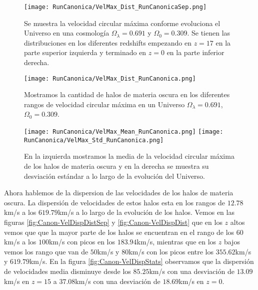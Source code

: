 \begin{figure}[H]
    \centering
    \texttt{[image: RunCanonica/VelMax\_Dist\_RunCanonicaSep.png]}
    \caption[Velocidad circular máxima en la evolución de un Universo $\Omega_\lambda = 0.691 $, $\Omega_0 = 0.309$]{\footnotesize Se muestra la velocidad circular máxima conforme evoluciona el Universo en una cosmología $\Omega_\lambda = 0.691 $ y $\Omega_0 = 0.309$. Se tienen las distribuciones en los diferentes redshifts empezando en $z=17$ en la parte superior izquierda y terminado en $z=0$ en la parte inferior derecha.}
    \label{fig:Canon-VelMaxDistSep}
\end{figure}

\begin{figure}[H]
    \centering
    \texttt{[image: RunCanonica/VelMax\_Dist\_RunCanonica.png]}
    \caption[Distribución de la velocidad circular máxima de un Universo $\Omega_\lambda = 0.691 $, $\Omega_0 = 0.309$]{\footnotesize Mostramos la cantidad de halos de materia oscura en los diferentes rangos de velocidad circular máxima en un Universo $\Omega_\lambda = 0.691 $, $\Omega_0 = 0.309$.}
    \label{fig:Canon-VelMaxDist}
\end{figure}

\begin{figure}[H]
    \centering
    \texttt{[image: RunCanonica/VelMax\_Mean\_RunCanonica.png]}
    \texttt{[image: RunCanonica/VelMax\_Std\_RunCanonica.png]}
    \caption[Media y desviación estándar de la velocidad circular máxima de un Universo $\Omega_\lambda = 0.691 $, $\Omega_0 = 0.309$]{\footnotesize En la izquierda mostramos la media de la velocidad circular máxima de los halos de materia oscura y en la derecha se muestra su desviación estándar a lo largo de la evolución del Universo.}
    \label{fig:Canon-VelMaxStats}
\end{figure}

Ahora hablemos de la dispersion de las velocidades de los halos de materia oscura. La dispersión de velocidades de estos halos esta en los rangos de $12.78$km/s a los $619.79$km/s a lo largo de la evolución de los halos. Vemos en las figuras \ref{fig:Canon-VelDispDistSep} y \ref{fig:Canon-VelDispDist} que en los $z$ altos vemos que que la mayor parte de los halos se encuentran en el rango de los $60$km/s a los $100$km/s con picos en los $183.94$km/s, mientras que en los $z$ bajos vemos los rango que van de $50$km/s y $80$km/s con los picos entre los $355.62$km/s y $619.79$km/s. En la figura \ref{fig:Canon-VelDispStats} observamos que la dispersión de velocidades media disminuye desde los $85.25$km/s con una desviación de $13.09$km/s en $z=15$ a $37.08$km/s con una desviación de $18.69$km/s en $z=0$.

